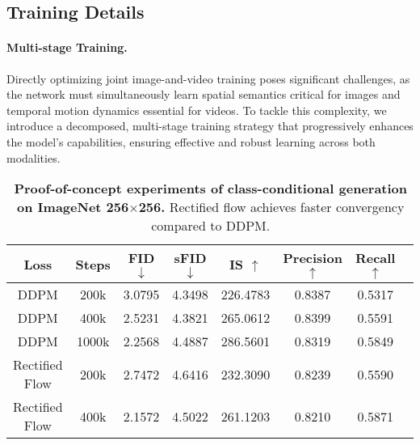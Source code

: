 \subsection{Training Details}\label{sec:training}
\paragraph{Multi-stage Training.} Directly optimizing joint image-and-video training poses significant challenges, as the network must simultaneously learn spatial semantics critical for images and temporal motion dynamics essential for videos. To tackle this complexity, we introduce a decomposed, multi-stage training strategy that progressively enhances the model’s capabilities, ensuring effective and robust learning across both modalities.

\begin{table}[t]
    \centering
    \begin{tabular}{cccccccc}
    \toprule
    Loss & Steps & FID $\downarrow$ & sFID $\downarrow$ & IS $\uparrow$ & Precision $\uparrow$ & Recall $\uparrow$ \\
    \midrule
    DDPM & 200k & 3.0795 & 4.3498 & 226.4783 & 0.8387 & 0.5317  \\
    DDPM & 400k & 2.5231 & 4.3821 & 265.0612 & 0.8399 & 0.5591 \\
    DDPM & 1000k & 2.2568 & 4.4887 & 286.5601 & 0.8319 & 0.5849  \\
    \midrule
    Rectified Flow & 200k & 2.7472 & 4.6416 & 232.3090 & 0.8239 & 0.5590  \\
    Rectified Flow & 400k & 2.1572 & 4.5022 & 261.1203 & 0.8210 & 0.5871  \\

    \bottomrule
    \end{tabular}
    \caption{\textbf{Proof-of-concept experiments of class-conditional generation on ImageNet 256$\times$256.} Rectified flow achieves faster convergency compared to DDPM.}\label{tab:toy-fid}
\end{table}


